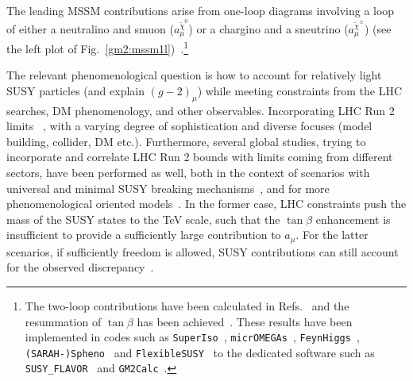 \documentclass[10pt]{article}
\begin{document}
The leading MSSM contributions arise from one-loop diagrams involving a loop of either a neutralino and smuon ($a^{\tilde{\chi}^0}_{\mu}$) or a chargino and a sneutrino ($a^{\tilde{\chi}^{\pm}}_{\mu}$) (see the left plot of Fig.~\ref{gm2:mssm1l})~\cite{Fayet1980,Grifols:1982vx,Ellis:1982by,Barbieri:1982aj,Romao:1984pn,Kosower:1983yw,Yuan:1984ww,Vendramin:1988rd}.\footnote{The two-loop
contributions have been calculated in Refs.~\cite{Chen:2001kn,Arhrib:2001xx,Heinemeyer:2003dq,Heinemeyer:2004yq,Feng:2006ei,Marchetti:2008hw,vonWeitershausen:2010zr,Fargnoli:2013zda,Fargnoli:2013zia} and the resummation
of $\tan\beta$ has been achieved~\cite{Marchetti:2008hw,Crivellin:2011jt,Bach:2015doa}. These results have been implemented in codes
such as {\tt SuperIso}~\cite{Mahmoudi:2007vz,Mahmoudi:2008tp,Mahmoudi:2009zz}, {\tt micrOMEGAs}~\cite{Belanger:2018ccd}, {\tt FeynHiggs}~\cite{Heinemeyer:2004yq,Heinemeyer:2003dq}, {\tt
(SARAH-)Spheno}~\cite{Porod:2011nf} and {\tt FlexibleSUSY}~\cite{Athron:2017fvs} to the dedicated software such as {\tt SUSY\_FLAVOR}~\cite{Crivellin:2012jv} and {\tt GM2Calc}~\cite{Athron:2015rva}.}

The relevant phenomenological question is how to account for relatively light SUSY particles (and explain $(g-2)_{\mu}$) while meeting constraints from the LHC searches, DM phenomenology, and other observables. Incorporating LHC Run 2 limits ~\cite{Zhu:2016ncq,Yamaguchi:2016oqz,Choudhury:2017acn,Hagiwara:2017lse,Chakraborti:2017dpu,Yanagida:2017dao,Endo:2017zrj,Yanagida:2018eho,Pozzo:2018anw,Cox:2018qyi,Bhattacharyya:2018inr,Cox:2018vsv,Endo:2020mqz,Chakraborti:2020vjp,Horigome:2021qof,Athron:2021iuf,Tran:2018kxv,Wang:2018vrr,Abdughani:2019wai,Ibe:2019jbx,Yanagida:2020jzy,Baum:2021qzx,Ibe:2021cvf,Yin:2021mls,Han:2021ify,VanBeekveld:2021tgn,Cox:2021gqq,Endo:2021zal,Ahmed:2021htr,Wang:2021bcx,Gu:2021mjd,Chakraborti:2021bmv,Chakraborti:2021kkr,Chakraborti:2021dli,Baer:2021aax,Li:2021pnt},
with a varying degree of sophistication and diverse focuses (model building, collider, DM etc.). Furthermore, several global studies, trying to incorporate and correlate LHC Run 2 bounds with limits coming from different sectors, have been performed as well, both in the context of scenarios with universal and minimal SUSY breaking mechanisms~\cite{Bagnaschi:2016afc,Bagnaschi:2016xfg,GAMBIT:2017snp,Costa:2017gup}, and for more phenomenological oriented models~\cite{GAMBIT:2017zdo,Bagnaschi:2017tru}. In the former case, LHC constraints push the mass of the SUSY states to the TeV scale, such that the $\tan\beta$ enhancement is insufficient to provide a sufficiently large contribution to $a_{\mu}$. For the latter scenarios, if sufficiently freedom is allowed, SUSY contributions can still account for the observed discrepancy~\cite{Bagnaschi:2017tru}.
\end{document}
